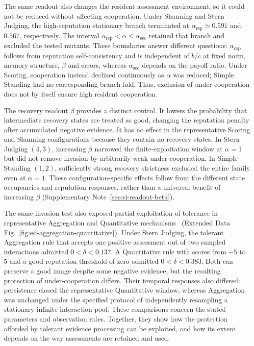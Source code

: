 \documentclass[fleqn,10pt]{wlscirep}
\begin{document}
The same readout also changes the resident assessment environment, so it could not be reduced without affecting cooperation. Under Shunning and Stern Judging, the high-reputation stationary branch terminated at $\alpha_{\mathrm{rep}}\simeq0.591$ and $0.567$, respectively. The interval $\alpha_{\mathrm{rep}}<\alpha\leq\alpha_{\mathrm{sec}}$ retained that branch and excluded the tested mutants. These boundaries answer different questions: $\alpha_{\mathrm{rep}}$ follows from reputation self-consistency and is independent of $b/c$ at fixed norm, memory structure, $\beta$ and errors, whereas $\alpha_{\mathrm{sec}}$ depends on the payoff ratio. Under Scoring, cooperation instead declined continuously as $\alpha$ was reduced; Simple Standing had no corresponding branch fold. Thus, exclusion of under-cooperation does not by itself ensure high resident cooperation.

The recovery readout $\beta$ provides a distinct control. It lowers the probability that intermediate recovery states are treated as good, changing the reputation penalty after accumulated negative evidence. It has no effect in the representative Scoring and Shunning configurations because they contain no recovery states. In Stern Judging $(4,3)$, increasing $\beta$ narrowed the finite-exploitation window at $\alpha=1$ but did not remove invasion by arbitrarily weak under-cooperation. In Simple Standing $(1,2)$, sufficiently strong recovery strictness excluded the entire family even at $\alpha=1$. These configuration-specific effects follow from the different state occupancies and reputation responses, rather than a universal benefit of increasing $\beta$ (Supplementary Note~\ref{sec:si-readout-beta}).

The same invasion test also exposed partial exploitation of tolerance in representative Aggregation and Quantitative mechanisms~\cite{michelmata2024,schmid2023} (Extended Data Fig.~\ref{fig:ed-aggregation-quantitative}). Under Stern Judging, the tolerant Aggregation rule that accepts one positive assessment out of two sampled interactions admitted $0<\delta<0.137$. A Quantitative rule with scores from $-5$ to $5$ and a good-reputation threshold of zero admitted $0<\delta<0.383$. Both can preserve a good image despite some negative evidence, but the resulting protection of under-cooperation differs. Their temporal responses also differed: persistence closed the representative Quantitative window, whereas Aggregation was unchanged under the specified protocol of independently resampling a stationary infinite interaction pool. These comparisons concern the stated parameters and observation rules. Together, they show how the protection afforded by tolerant evidence processing can be exploited, and how its extent depends on the way assessments are retained and used.
\end{document}
